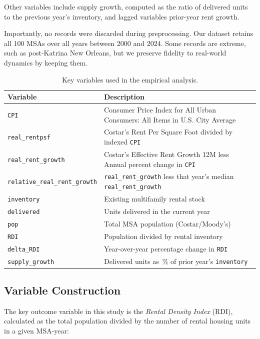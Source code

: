 \documentclass[APA,Times1COL]{WileyNJDv5} %
\begin{document}
Other variables include supply growth, computed as the ratio of delivered units to the previous year's inventory, and lagged variables prior-year rent growth. 

Importantly, no records were discarded during preprocessing. Our dataset retains all 100 MSAs over all years between 2000 and 2024. Some records are extreme, such as post-Katrina New Orleans, but we preserve fidelity to real-world dynamics by keeping them.

\begin{table}[hbt]%
\centering
\caption{Key variables used in the empirical analysis.\label{tab:variables}}%
\begin{tabular*}{\textwidth}{@{\extracolsep\fill}ll@{\extracolsep\fill}}%
\toprule
\textbf{Variable} & \textbf{Description} \\
\midrule
\texttt{CPI}					& Consumer Price Index for All Urban Consumers: All Items in U.S. City Average \\
\texttt{real\_rentpsf}               & Costar's Rent Per Square Foot divided by indexed \texttt{CPI}\\
\texttt{real\_rent\_growth}          & Costar's Effective Rent Growth 12M less Annual percent change in \texttt{CPI} \\
\texttt{relative\_real\_rent\_growth}          & \texttt{real\_rent\_growth} less that year's median \texttt{real\_rent\_growth}\\
\texttt{inventory}             & Existing multifamily rental stock \\
\texttt{delivered}             & Units delivered in the current year \\
\texttt{pop}                   & Total MSA population (Costar/Moody’s) \\
\texttt{RDI}			       & Population divided by rental inventory \\
\texttt{delta\_RDI}	           & Year‐over‐year percentage change in \texttt{RDI} \\
\texttt{supply\_growth}        & Delivered units as \% of prior year's \texttt{inventory}\\
\bottomrule
\end{tabular*}
\end{table}


\subsection{Variable Construction}
The key outcome variable in this study is the \textit{Rental Density Index} (RDI), calculated as the total population divided by the number of rental housing units in a given MSA-year:
\end{document}
